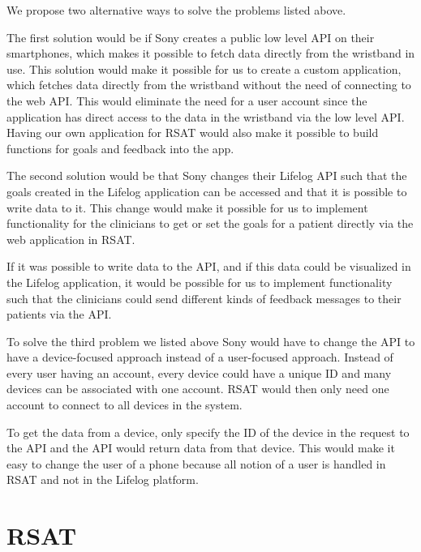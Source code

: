 \documentclass{cslthse-msc}
\begin{document}
We propose two alternative ways to solve the problems listed above. 

The first solution would be if Sony creates a public low level API on their smartphones, which makes it possible to fetch data directly from the wristband in use. This solution would make it possible for us to create a custom application, which fetches data directly from the wristband without the need of connecting to the web API. This would eliminate the need for a user account since the application has direct access to the data in the wristband via the low level API. Having our own application for RSAT would also make it possible to build functions for goals and feedback into the app.

The second solution would be that Sony changes their Lifelog API such that the goals created in the Lifelog application can be accessed and that it is possible to write data to it. This change would make it possible for us to implement functionality for the clinicians to get or set the goals for a patient directly via the web application in RSAT. 

If it was possible to write data to the API, and if this data could be visualized in the Lifelog application, it would be possible for us to implement functionality such that the clinicians could send different kinds of feedback messages to their patients via the API. 

To solve the third problem we listed above Sony would have to change the API to have a device-focused approach instead of a user-focused approach. Instead of every user having an account, every device could have a unique ID and many devices can be associated with one account. RSAT would then only need one account to connect to all devices in the system. 

To get the data from a device, only specify the ID of the device in the request to the API and the API would return data from that device. This would make it easy to change the user of a phone because all notion of a user is handled in RSAT and not in the Lifelog platform. 





\section{RSAT}
\end{document}

